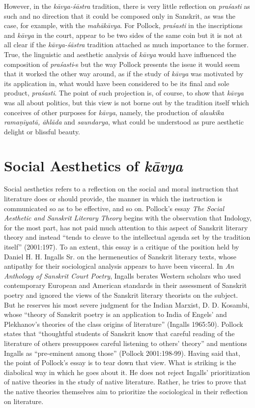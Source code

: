 However, in the {\sl kāvya-śāstra} tradition, there is very little reflection on {\sl praśasti} as such and no direction that it could be composed only in Sanskrit, as was the case, for example, with the {\sl mahākāvya}. For Pollock, {\sl praśasti} in the inscriptions and {\sl kāvya} in the court, appear to be two sides of the same coin but it is not at all clear if the {\sl kāvya-śāstra} tradition attached as much importance to the former. True, the linguistic and aesthetic analysis of {\sl kāvya} would have influenced the composition of {\sl praśasti}-s but the way Pollock presents the issue it would seem that it worked the other way around, as if the study of {\sl kāvya} was motivated by its application in, what would have been considered to be its final and sole product, {\sl praśasti}. The point of such projection is, of course, to show that {\sl kāvya} was all about politics, but this view is not borne out by the tradition itself which conceives of other purposes for {\sl kāvya}, namely, the production of {\sl alaukika ramaṇīyatā, āhlāda} and {\sl saundarya}, what could be understood as pure aesthetic delight or blissful beauty. 

\section*{Social Aesthetics of {\sl\bfseries kāvya}}

Social aesthetics refers to a reflection on the social and moral instruction that literature does or should provide, the manner in which the instruction is communicated so as to be effective, and so on. Pollock's essay {\sl The Social Aesthetic and Sanskrit Literary Theory} begins with the observation that Indology, for the most part, has not paid much attention to this aspect of Sanskrit literary theory and instead ``tends to cleave to the intellectual agenda set by the tradition itself'' (2001:197). To an extent, this essay is a critique of the position held by Daniel H. H. Ingalls Sr. on the hermeneutics of Sanskrit literary texts, whose antipathy for their sociological analysis appears to have been visceral. In {\sl An Anthology of Sanskrit Court Poetry}, Ingalls berates Western scholars who used contemporary European and American standards in their assessment of Sanskrit poetry and ignored the views of the Sanskrit literary theorists on the subject. But he reserves his most severe judgment for the Indian Marxist, D. D. Kosambi, whose ``theory of Sanskrit poetry is an application to India of Engels' and Plekhanov's theories of the class origins of literature'' (Ingalls 1965:50). Pollock states that ``thoughtful students of Sanskrit know that careful reading of the literature of others presupposes careful listening to others' theory'' and mentions Ingalls as ``pre-eminent among those'' (Pollock 2001:198-99). Having said that, the point of Pollock's essay is to tear down that view. What is striking is the diabolical way in which he goes about it. He does not reject Ingalls' prioritization of native theories in the study of native literature. Rather, he tries to prove that the native theories themselves aim to prioritize the sociological in their reflection on literature.


